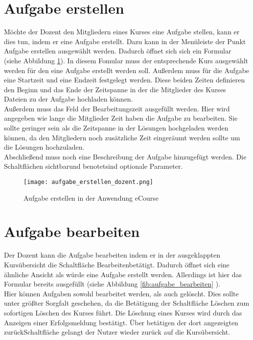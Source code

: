 \section{Aufgabe erstellen}
Möchte der Dozent den Mitgliedern eines Kurses eine Aufgabe stellen, kann er dies tun, indem er eine Aufgabe erstellt. Dazu kann in der Menüleiste der Punkt \glqq Aufgabe erstellen\grqq\; ausgewählt werden. Dadurch öffnet sich sich ein Formular (siehe Abbildung \ref{fib:aufgabe_anlegen}). 
In diesem Fomular muss der entsprechende Kurs ausgewählt werden für den eine Aufgabe erstellt werden soll. Außerdem muss für die Aufgabe eine Startzeit und eine Endzeit festgelegt werden. Diese beiden Zeiten definieren den Beginn und das Ende der Zeitspanne in der die Mitglieder des Kurses Dateien zu der Aufgabe hochladen können. \\
Außerdem muss das Feld der Bearbeitungszeit ausgefüllt werden. Hier wird angegeben wie lange die Mitglieder Zeit haben die Aufgabe zu bearbeiten. Sie sollte geringer sein als die Zeitspanne in der Lösungen hochgeladen werden können, da den Mitgliedern noch zusätzliche Zeit eingeräumt werden sollte um die Lösungen hochzuladen. \\
Abschließend muss noch eine Beschreibung der Aufgabe hinzugefügt werden. 
Die Schaltflächen \glqq sichtbar\grqq und \glqq benotet\grqq sind optionale Parameter.

\begin{figure}[h]
\centering
\texttt{[image: aufgabe\_erstellen\_dozent.png]}
\caption{Aufgabe erstellen in der Anwendung eCourse}
\label{fib:aufgabe_anlegen}
\end{figure}


\section{Aufgabe bearbeiten}
\label{sec:bearbeiten}
Der Dozent kann die Aufgabe bearbeiten indem er in der ausgeklappten Kursübersicht die Schaltfläche \glqq Bearbeiten\grqq betätigt. Dadurch öffnet sich eine ähnliche Ansicht als würde eine Aufgabe erstellt werden. Allerdings ist hier das Formular bereits ausgefüllt (siehe Abbildung \ref{fib:aufgabe_bearbeiten} ).\\
Hier können Aufgaben sowohl bearbeitet werden, als auch gelöscht. 
Dies sollte unter größter Sorgfalt geschehen, da die Betätigung der Schaltfläche \glqq Löschen\grqq\: zum sofortigen Löschen des Kurses führt. Die Löschung eines Kurses wird durch das Anzeigen einer Erfolgsmeldung bestätigt. Über betätigen der dort angezeigten \glqq zurück\grqq Schaltfläche gelangt der Nutzer wieder zurück auf die Kursübersicht.

